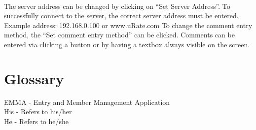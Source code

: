 \documentclass[10pt,a4paper]{article}
\begin{document}
\paragraph{}
The server address can be changed by clicking on “Set Server Address”. To successfully connect to the server, the correct server address must be entered. Example address: 192.168.0.100 or www.uRate.com
To change the comment entry method, the “Set comment entry method” can be clicked. Comments can be entered via clicking a button or by having a textbox always visible on the screen.
\section{Glossary}
EMMA - Entry and Member Management Application\\
His - Refers to his/her\\
He - Refers to he/she
\end{document}
